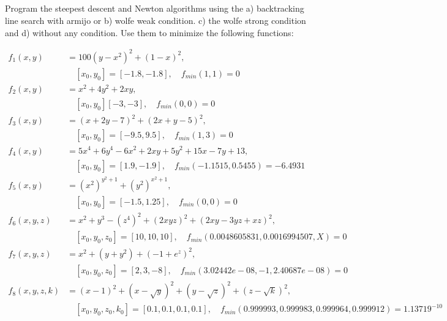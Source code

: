 \documentclass[a4paper,11pt]{article}
\numberwithin{equation}{section} %
\begin{document}

\clearpage

\subsection{}

Program the steepest descent and Newton algorithms using the a) backtracking line search with armijo or b) wolfe weak condition. c) the wolfe strong condition and d) without any condition. Use them to minimize the following functions:

\begin{align*}
    f_1(x,y) &= 100 (y-x^2)^2 + (1-x)^2, \\ &\quad [x_0,y_0] = [-1.8,-1.8], \quad f_{min}(1,1)=0  \\
    f_2(x,y) &= x^2 + 4y^2 + 2xy, \\ & \quad [x_0,y_0] [-3,-3], \quad f_{min}(0,0) = 0 \\
    f_3(x,y) &= (x+2y-7)^2 + (2x+y-5)^2, \\ & \quad [x_0,y_0] = [-9.5,9.5], \quad f_{min}(1,3) = 0 \\
    f_4(x,y) &= 5x^4 + 6y^4 - 6x^2 + 2xy + 5y^2 + 15x -7y + 13, \\ & \quad [x_0,y_0] = [1.9,-1.9], \quad f_{min}(-1.1515,0.5455) = -6.4931 \\ 
    f_5(x,y) &= (x^2)^{y^2+1} + (y^2)^{x^2+1},\\ & \quad [x_0,y_0] = [-1.5,1.25], \quad f_{min}(0,0) = 0 \\
    f_6(x,y,z) &= x^2 + y^3 - (z^4)^2 + (2xyz)^2 + (2xy-3yz+xz)^2, \\ & \quad [x_0,y_0,z_0] = [10,10,10], \quad f_{min}(0.0048605831,0.0016994507,X) = 0 \\
    f_7(x,y,z) &= x^2 + (y + y^2) + (-1 + e^z)^2, \\ & \quad [x_0,y_0,z_0] = [2,3,-8], \quad f_{min}(3.02442e-08,-1,2.40687e-08) = 0 \\
    f_8(x,y,z,k) &= (x-1)^2 + (x-\sqrt{y})^2 + (y-\sqrt{z})^2 + (z-\sqrt{k})^2, \\ & \quad [x_0,y_0,z_0,k_0] = [0.1,0.1,0.1,0.1], \quad f_{min}(0.999993,0.999983,0.999964,0.999912) = 1.13719^{-10} \\
\end{align*}
\end{document}

